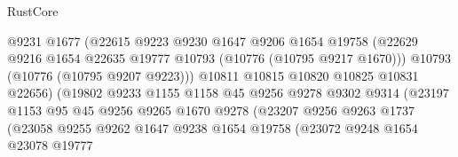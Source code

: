 \begin{lexlean}{RustCore}
\begin{coremodule}
                                    @9231
                                    @1677
                                    (@22615
                                      @9223
                                      @9230
                                      @1647
                                      @9206
                                      @1654
                                      @19758
                                      (@22629
                                        @9216
                                        @1654
                                        @22635
                                        @19777
                                        @10793
                                        (@10776 (@10795 @9217 @1670)))
                                      @10793
                                      (@10776 (@10795 @9207 @9223)))
                                    @10811
                                    @10815
                                    @10820
                                    @10825
                                    @10831
                                    @22656)
                                  (@19802
                                    @9233
                                    @1155
                                    @1158
                                    @45
                                    @9256
                                    @9278
                                    @9302
                                    @9314
                                    (@23197
                                      @1153
                                      @95
                                      @45
                                      @9256
                                      @9265
                                      @1670
                                      @9278
                                      (@23207
                                        @9256
                                        @9263
                                        @1737
                                        (@23058
                                          @9255
                                          @9262
                                          @1647
                                          @9238
                                          @1654
                                          @19758
                                          (@23072
                                            @9248
                                            @1654
                                            @23078
                                            @19777

\end{coremodule}
\end{lexlean}

